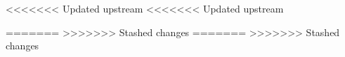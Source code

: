 \documentclass[10pt,fleqn]{article} %
\begin{document}
<<<<<<< Updated upstream
<<<<<<< Updated upstream
	
=======
>>>>>>> Stashed changes
=======
>>>>>>> Stashed changes
\end{document}
